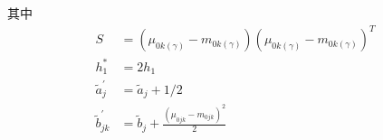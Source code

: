\documentclass[a4paper]{article}
\begin{document}
其中
$$
\begin{aligned}
S&=(\mu_{0k(\gamma)}-m_{0k(\gamma)})(\mu_{0k(\gamma)}-m_{0k(\gamma)})^T\\
 h_1^*&=2h_1\\
\tilde{a}_{j}^{\prime}&=\tilde{a}_{j}+1 / 2\\
\tilde{b}_{j k}^{\prime}&=\tilde{b}_{j}+\frac{\left(\mu_{0 j k}-m_{0 j k}\right)^{2}}{2}
\end{aligned}
$$
\end{document}
